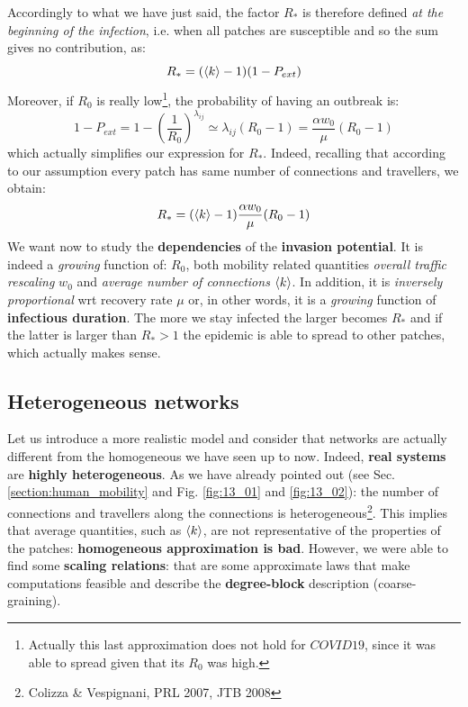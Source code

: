 \documentclass[../main/main.tex]{subfiles}
\begin{document}
Accordingly to what we have just said, the factor $R_*$ is therefore defined \textit{at the beginning of the infection}, i.e. when all patches are susceptible and so the sum gives no contribution, as:
\begin{equation}
    R_* = (\expval{k}-1)(1-P_{ext})
\end{equation}
Moreover, if $R_0$ is really low\footnote{Actually this last approximation does not hold for $COVID19$, since it was able to spread given that its $R_0$ was high.}, the probability of having an outbreak is:
\begin{equation}
    1 - P_{ext} = 1 - \left(\frac{1}{R_0} \right) ^{\lambda_{ij}} \simeq \lambda_{ij} (R_0 - 1) = \frac{\alpha w_0}{\mu} (R_0 - 1)
\end{equation}
which actually simplifies our expression for $R_*$. Indeed, recalling that according to our assumption every patch has same number of connections and travellers, we obtain:
\begin{equation}
    R_* = (\expval{k}-1)\frac{\alpha w_0}{\mu} (R_0 - 1)
\end{equation}
We want now to study the \textbf{dependencies} of the \textbf{invasion potential}. It is indeed a \textit{growing} function of: $R_0$, both mobility related quantities \textit{overall traffic rescaling} $w_0$ and \textit{average number of connections} $\expval{k}$. In addition, it is \textit{inversely proportional} wrt recovery rate $\mu$ or, in other words, it is a \textit{growing} function of \textbf{infectious duration}. The more we stay infected the larger becomes $R_*$ and if the latter is larger than $R_* > 1$ the epidemic is able to spread to other patches, which actually makes sense.


\subsection{Heterogeneous networks}

Let us introduce a more realistic model and consider that networks are actually different from the homogeneous we have seen up to now. Indeed, \textbf{real systems} are \textbf{highly heterogeneous}. As we have already pointed out (see Sec. \ref{section:human_mobility} and Fig. \ref{fig:13_01} and \ref{fig:13_02}): the number of connections and travellers along the connections is heterogeneous\footnote{Colizza \& Vespignani, PRL 2007, JTB 2008}. This implies that average quantities, such as $\expval{k}$, are not representative of the properties of the patches: \textbf{homogeneous approximation is bad}.
However, we were able to find some \textbf{scaling relations}: that are some approximate laws that make computations feasible and describe the \textbf{degree-block} description (coarse-graining).
\end{document}
